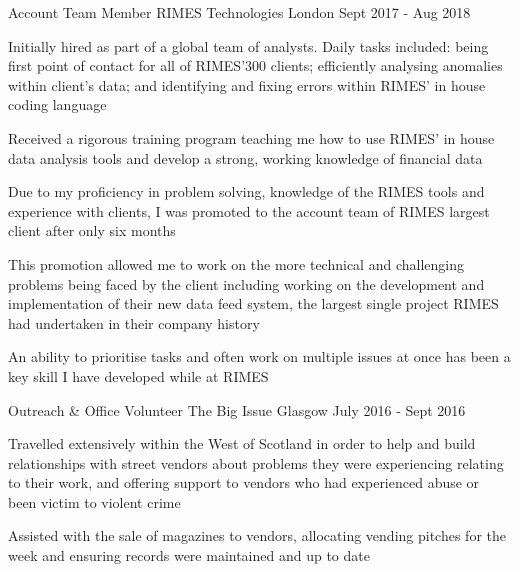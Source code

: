 
\begin{cventries}

  \cventry
    {Account Team Member} %
    {RIMES Technologies} %
    {London} %
    {Sept 2017 - Aug 2018} %
    {
      \begin{cvitems} %
        \item Initially hired as part of a global team of analysts. Daily tasks included: being first point of contact for all of RIMES'300 clients; efficiently analysing anomalies within client’s data; and identifying and fixing errors within RIMES' in house coding language
        \item Received a rigorous training program teaching me how to use RIMES' in house data analysis tools and develop a strong, working knowledge of financial data
        \item Due to my proficiency in problem solving, knowledge of the RIMES tools and experience with clients, I was promoted to the account team of RIMES largest client after only six months
        \item This promotion allowed me to work on the more technical and challenging problems being faced by the client including working on the development and implementation of their new data feed system, the largest single project RIMES had undertaken in their company history
        \item An ability to prioritise tasks and often work on multiple issues at once has been a key skill I have developed while at RIMES
      \end{cvitems}
    }

  \cventry
    {Outreach \& Office Volunteer} %
    {The Big Issue} %
    {Glasgow} %
    {July 2016 - Sept 2016} %
    {
      \begin{cvitems} %
      \item Travelled extensively within the West of Scotland in order to help and build relationships with street vendors about problems they were experiencing relating to their work, and offering support to vendors who had experienced abuse or been victim to violent crime
      \item Assisted with the sale of magazines to vendors, allocating vending pitches for the week and ensuring records were maintained and up to date
      \end{cvitems}
    }



\end{cventries}
